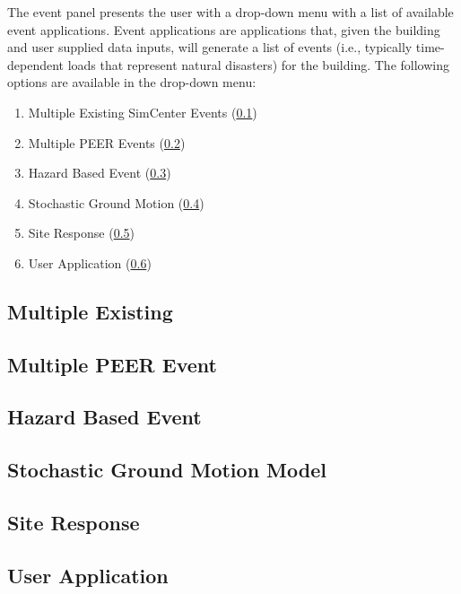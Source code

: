 The event panel presents the user with a drop-down menu with a list of
available event applications. Event applications are applications
that, given the building and user supplied data inputs, will generate
a list of events (i.e., typically time-dependent loads that represent natural disasters) for the building. The following options
are available in the drop-down menu:

\begin{enumerate}
\item Multiple Existing SimCenter Events (\ref{subsec:multiple_existing})
\item Multiple PEER Events (\ref{subsec:multiple_peer})
\item Hazard Based Event (\ref{subsec:hazard_based})
\item Stochastic Ground Motion (\ref{subsec:stochastic_motions})
\item Site Response (\ref{subsec:site_response})
\item User Application (\ref{subsec:user_event})
\end{enumerate}

\subsection{Multiple Existing}
\label{subsec:multiple_existing}


\subsection{Multiple PEER Event}
\label{subsec:multiple_peer}


\subsection{Hazard Based Event}
\label{subsec:hazard_based}


\subsection{Stochastic Ground Motion Model}
\label{subsec:stochastic_motions}


\subsection{Site Response}
\label{subsec:site_response}


\subsection{User Application}
\label{subsec:user_event}

